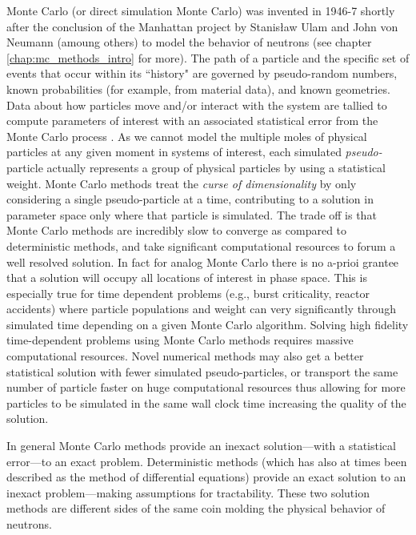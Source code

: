 Monte Carlo (or direct simulation Monte Carlo) was invented in 1946-7 shortly after the conclusion of the Manhattan project by Stanisław Ulam and John von Neumann (amoung others) to model the behavior of neutrons (see chapter \ref{chap:mc_methods_intro} for more).
The path of a particle and the specific set of events that occur within its ``history" are governed by pseudo-random numbers, known probabilities (for example, from material data), and known geometries.
Data about how particles move and/or interact with the system are tallied to compute parameters of interest with an associated statistical error from the Monte Carlo process \cite{kayla_phd}.
As we cannot model the multiple moles of physical particles at any given moment in systems of interest, each simulated \textit{pseudo-}particle actually represents a group of physical particles by using a statistical weight.
Monte Carlo methods treat the \textit{curse of dimensionality} by only considering a single pseudo-particle at a time, contributing to a solution in parameter space only where that particle is simulated.
The trade off is that Monte Carlo methods are incredibly slow to converge as compared to deterministic methods, and take significant computational resources to forum a well resolved solution.
In fact for analog Monte Carlo there is no a-prioi grantee that a solution will occupy all locations of interest in phase space.
This is especially true for time dependent problems (e.g., burst criticality, reactor accidents) where particle populations and weight can very significantly through simulated time depending on a given Monte Carlo algorithm.
Solving high fidelity time-dependent problems using Monte Carlo methods requires massive computational resources.
Novel numerical methods may also get a better statistical solution with fewer simulated pseudo-particles, or transport the same number of particle faster on huge computational resources thus allowing for more particles to be simulated in the same wall clock time increasing the quality of the solution.

In general Monte Carlo methods provide an inexact solution---with a statistical error---to an exact problem.
Deterministic methods (which has also at times been described as the method of differential equations) provide an exact solution to an inexact problem---making assumptions for tractability.
These two solution methods are different sides of the same coin molding the physical behavior of neutrons.

